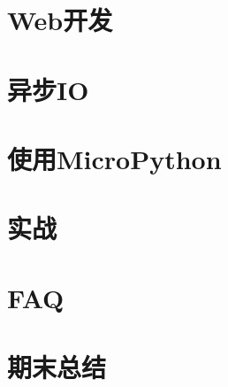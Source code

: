 \newpage
\section{Web开发}

\newpage

\newpage

\newpage

\newpage

\newpage



\newpage
\section{异步IO}

\newpage

\newpage

\newpage

\newpage



\newpage
\section{使用MicroPython}

\newpage

\newpage

\newpage

\newpage



\newpage
\section{实战}

\newpage

\newpage

\newpage

\newpage

\newpage

\newpage

\newpage

\newpage

\newpage

\newpage

\newpage

\newpage

\newpage

\newpage

\newpage

\newpage


\newpage
\section{FAQ}



\newpage
\section{期末总结}


